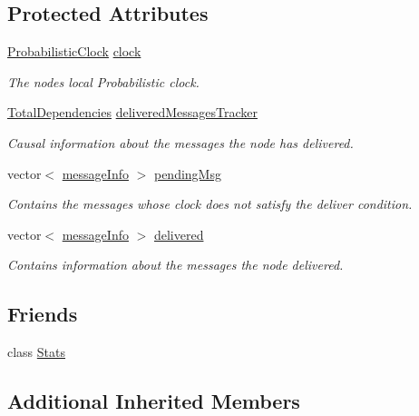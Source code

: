 \subsection*{Protected Attributes}
\begin{DoxyCompactItemize}
\item 
\hyperlink{class_probabilistic_clock}{Probabilistic\+Clock} \hyperlink{class_node_with_control_a051a7d7f2452f1f8da3bc5bfb05a7760}{clock}
\begin{DoxyCompactList}\small\item\em The node\textquotesingle{}s local Probabilistic clock. \end{DoxyCompactList}\item 
\hyperlink{class_total_dependencies}{Total\+Dependencies} \hyperlink{class_node_with_control_a6c868fa52cca68f650dca96a788475df}{delivered\+Messages\+Tracker}
\begin{DoxyCompactList}\small\item\em Causal information about the messages the node has delivered. \end{DoxyCompactList}\item 
vector$<$ \hyperlink{structures_8h_a7e7bdc1d2fff8a9436f2f352b2711ed6}{message\+Info} $>$ \hyperlink{class_node_with_control_af38ffbedc82038536c77314f22ea6b57}{pending\+Msg}
\begin{DoxyCompactList}\small\item\em Contains the messages whose clock does not satisfy the deliver condition. \end{DoxyCompactList}\item 
vector$<$ \hyperlink{structures_8h_a7e7bdc1d2fff8a9436f2f352b2711ed6}{message\+Info} $>$ \hyperlink{class_node_with_control_aed34cc5a5b277c43f10f8cbbbeb59327}{delivered}
\begin{DoxyCompactList}\small\item\em Contains information about the messages the node delivered. \end{DoxyCompactList}\end{DoxyCompactItemize}
\subsection*{Friends}
\begin{DoxyCompactItemize}
\item 
class \hyperlink{class_node_with_control_a129f65b6976377739eb6231b6962985e}{Stats}
\end{DoxyCompactItemize}
\subsection*{Additional Inherited Members}


